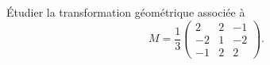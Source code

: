 \begin{enonce}
\begin{exercise}[ID={RMS124 E1219 CCP PSI},subtitle={},tags={}]
Étudier la transformation géométrique associée à 
\begin{equation*}
  M= \frac13 \begin{pmatrix} 2&2&-1\\ -2&1&-2\\ -1&2&2 \end{pmatrix}.
\end{equation*}
\end{exercise}
\begin{solution}
\end{solution}
\end{enonce}
